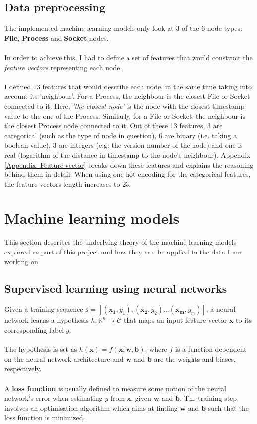 	\subsection{Data preprocessing} \label{Section: prep/data/feature-vectors}
	The implemented machine learning models only look at 3 of the 6 node types: \textbf{File}, \textbf{Process} and \textbf{Socket} nodes. 
	\\ \\
	In order to achieve this, I had to define a set of features that would construct the \textit{feature vectors} representing each node. 
	\\ \\
	I defined 13 features that would describe each node, in the same time taking into account its 'neighbour'. For a Process, the neighbour is the closest File or Socket connected to it. Here, \textit{'the closest node'} is the node with the closest timestamp value to the one of the Process. Similarly, for a File or Socket, the neighbour is the closest Process node connected to it. Out of these 13 features, 3 are categorical (such as the type of node in question), 6 are binary (i.e. taking a boolean value), 3 are integers (e.g: the version number of the node) and one is real (logarithm of the distance in timestamp to the node's neighbour). Appendix \ref{Appendix: Feature-vector} breaks down these features and explains the reasoning behind them in detail. When using one-hot-encoding for the categorical features, the feature vectors length increases to 23.

	\section{Machine learning models} \label{Section 2.2}
	This section describes the underlying theory of the machine learning models explored as part of this project and how they can be applied to the data I am working on.

	\subsection{Supervised learning using neural networks} \label{Section 2.2.2}
	Given a training sequence $\mathbf{s} = [(\mathbf{x_1}, y_1), (\mathbf{x_2}, y_2) \dots (\mathbf{x_m}, y_m)]$, a neural network learns a hypothesis $h: \mathbb{R}^n \rightarrow \mathcal{C}$ that maps an input feature vector $\mathbf{x}$ to its corresponding label $y$. 
	\\ \\ 
	The hypothesis is set as $h(\mathbf{x}) = f(\mathbf{x}; \mathbf{w}, \mathbf{b})$, where $f$ is a function dependent on the neural network architecture and $\mathbf{w}$ and $\mathbf{b}$ are the weights and biases, respectively. 
	\\ \\
	A \textbf{loss function} is usually defined to measure some notion of the neural network's error when estimating $y$ from $\mathbf{x}$, given $\mathbf{w}$ and $\mathbf{b}$. The training step involves an optimisation algorithm which aims at finding $\mathbf{w}$ and $\mathbf{b}$ such that the loss function is minimized. 
	
